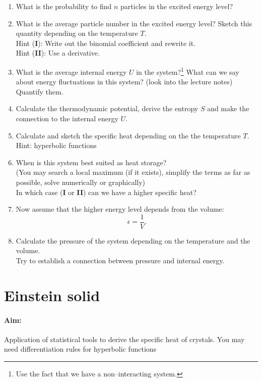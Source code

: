 \documentclass[12pt,a4paper]{article} %
\begin{document}
 \begin{enumerate}[resume]
 \item What is the probability to find $n$ particles in the excited energy level?
 \item What is the average particle number in the excited energy level? Sketch this quantity depending on the temperature $T$.\\Hint (\textbf{I}): Write out the binomial coefficient and rewrite it.\\
 Hint (\textbf{II}): Use a derivative.
 
 \item What is the average internal energy $U$ in the system?\footnote{Use the fact that we have a non--interacting system.} What can we say about energy fluctuations in this system? (look into the lecture notes) Quantify them.
 \item Calculate the thermodynamic potential, derive the entropy $S$ and make the connection to the internal energy $U$.
 
 \item Calculate and sketch the specific heat depending on the the temperature $T$. Hint: hyperbolic functions
 \item When is this system best suited as heat storage? \\ 
 (You may search a local maximum (if it exists), simplify the terms as far as possible, solve numerically or graphically)\\
 In which case (\textbf{I} or \textbf{II}) can we have a higher specific heat?
 
  
 \item Now assume that the higher energy level depends from the volume:
 $$ \epsilon = \frac{1}{V}.$$
 \item Calculate the pressure of the system depending on the temperature and the volume.\\
 Try to establish a connection between pressure and internal energy.
 
\end{enumerate}
 

 
 \section{Einstein solid}
 \paragraph{Aim:} Application of statistical tools to derive the specific heat of crystals. You may need differentiation rules for hyperbolic functions
\end{document}

